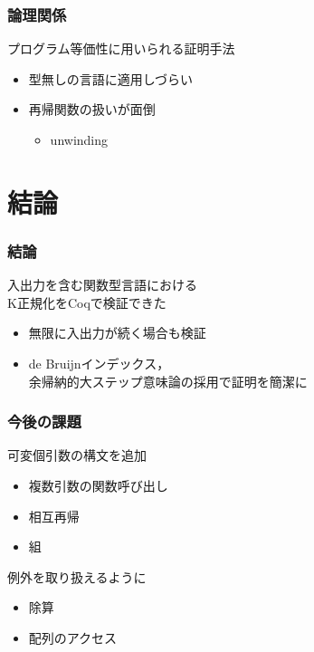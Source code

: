 \documentclass[dvipdfmx,cjk,xcolor=dvipsnames,envcountsect,notheorems,12pt]{beamer}
\theoremstyle{definition}
\begin{document}
\begin{frame}
	\frametitle{論理関係}
	\Large プログラム等価性に用いられる証明手法
	\begin{itemize}
		\item 型無しの言語に適用しづらい
		\item 再帰関数の扱いが面倒
			\begin{itemize}
				\item unwinding
			\end{itemize}
	\end{itemize}
\end{frame}

\section{結論}

\begin{frame}
	\frametitle{結論}
	\LARGE 入出力を含む関数型言語における\\
	K正規化をCoqで検証できた
	\begin{itemize}
		\item 無限に入出力が続く場合も検証
		\item de Bruijnインデックス，\\
			余帰納的大ステップ意味論の採用で証明を簡潔に
	\end{itemize}
\end{frame}

\begin{frame}
	\frametitle{今後の課題}
	\LARGE 可変個引数の構文を追加
	\begin{itemize}
		\item 複数引数の関数呼び出し
		\item 相互再帰
		\item 組
	\end{itemize}

	\vfill

	例外を取り扱えるように
	\begin{itemize}
		\item 除算
		\item 配列のアクセス
	\end{itemize}
\end{frame}
\end{document}

